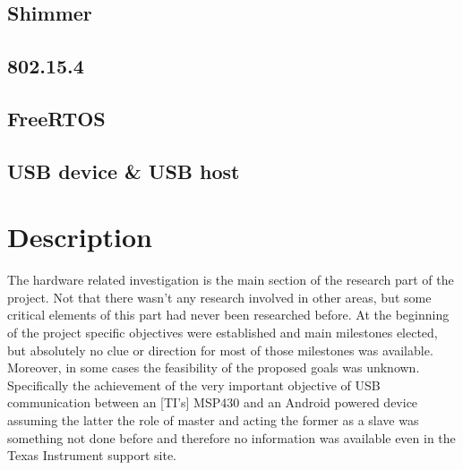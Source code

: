 		\subsection{Shimmer}
		\subsection{802.15.4}
		\label{ssec:802.15.4}
		\subsection{FreeRTOS}
		\label{ssec:FreeRTOS}
		\subsection{USB device \& USB host}

	\section{Description}



	The hardware related investigation is the main section of the research part of the project. Not that there wasn't any research involved in other areas, but some critical elements of this part had never been researched before. 
	At the beginning of the project specific objectives were established and main milestones elected, but absolutely no clue or direction for most of those milestones was available.
	Moreover, in some cases the feasibility of the proposed goals was unknown. Specifically the achievement of the very important objective of USB communication between an [TI's] MSP430 %
	and an Android powered device assuming the latter the role of master and acting the former as a slave was something not done before and therefore no information was available  even in the Texas Instrument support site.\\

